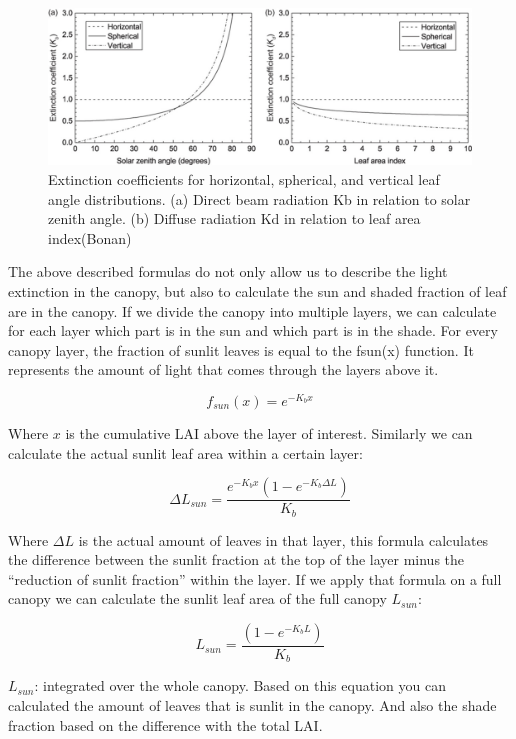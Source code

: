 \documentclass[12pt,oneside]{book}
\begin{document}
\begin{figure}

{\centering \includegraphics[width=0.8\linewidth]{figures/chap3/f312_Kb_angle} 

}

\caption{Extinction coefficients for horizontal, spherical, and vertical leaf angle distributions. (a) Direct beam radiation Kb in relation to solar zenith angle. (b) Diffuse radiation Kd in relation to leaf area index(Bonan)}\label{fig:f312}
\end{figure}

The above described formulas do not only allow us to describe the light
extinction in the canopy, but also to calculate the sun and shaded
fraction of leaf are in the canopy. If we divide the canopy into
multiple layers, we can calculate for each layer which part is in the
sun and which part is in the shade. For every canopy layer, the fraction
of sunlit leaves is equal to the fsun(x) function. It represents the
amount of light that comes through the layers above it.

\[
f_{sun} (x) = e^{-K_b x}
\]

Where \(x\) is the cumulative LAI above the layer of interest. Similarly
we can calculate the actual sunlit leaf area within a certain layer:

\[
\Delta L_{sun} = \frac{e^{-K_b x} \left(1 - e^{-K_b \Delta L} \right)}{K_b}
\]

Where \(\Delta L\) is the actual amount of leaves in that layer, this
formula calculates the difference between the sunlit fraction at the top
of the layer minus the ``reduction of sunlit fraction'' within the
layer. If we apply that formula on a full canopy we can calculate the
sunlit leaf area of the full canopy \(L_{sun}\):

\[
L_{sun} = \frac{\left(1 - e^{-K_b L} \right)}{K_b}
\]

\(L_{sun}\): integrated over the whole canopy. Based on this equation
you can calculated the amount of leaves that is sunlit in the canopy.
And also the shade fraction based on the difference with the total LAI.
\end{document}
